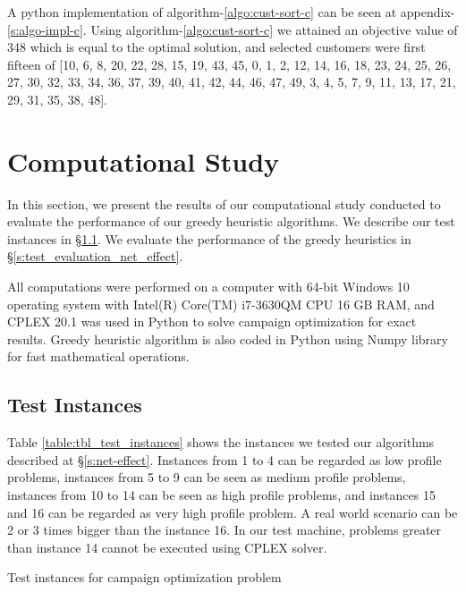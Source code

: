 \documentclass[11pt]{article}
\begin{document}
 A python implementation of algorithm-\ref{algo:cust-sort-c} can be seen at appendix-\ref{s:algo-impl-c}. Using algorithm-\ref{algo:cust-sort-c} we attained an objective value of 348 which is equal to the optimal solution, and selected customers were first fifteen of [10, 6, 8, 20, 22, 28, 15, 19, 43, 45, 0, 1, 2, 12, 14, 16, 18, 23, 24, 25, 26, 27, 30, 32, 33, 34, 36, 37, 39, 40, 41, 42, 44, 46, 47, 49, 3, 4, 5, 7, 9, 11, 13, 17, 21, 29, 31, 35, 38, 48].

\newpage
\section{Computational Study} \label{s:num-analysis}

In this section, we present the results of our computational study conducted to evaluate the performance of our greedy heuristic algorithms. We describe our test instances in \S \ref{test_cases}. We evaluate the performance of the greedy heuristics in \S \ref{s:test_evaluation_net_effect}.

All computations were performed on a computer with 64-bit Windows 10 operating system with Intel(R) Core(TM) i7-3630QM CPU 16 GB RAM, and CPLEX 20.1 was used in Python to solve campaign optimization for exact results. Greedy heuristic algorithm is also coded in Python using Numpy library for fast mathematical operations.

\subsection{Test Instances} \label{test_cases}
Table \ref{table:tbl_test_instances} shows the instances we tested our algorithms described at \S \ref{s:net-effect}. Instances from 1 to 4 can be regarded as low profile problems, instances from 5 to 9 can be seen as medium profile problems, instances from 10 to 14 can be seen as high profile problems, and instances 15 and 16 can be regarded as very high profile problem. A real world scenario can be 2 or 3 times bigger than the instance 16. In our test machine, problems greater than instance 14 cannot be executed using CPLEX solver.\\
 
\begin{table}[htb]
    \centering
    \caption[Short Caption for LoT]{Test instances for campaign optimization problem}\label{table:tbl_test_instances}
\end{table}
\end{document}
